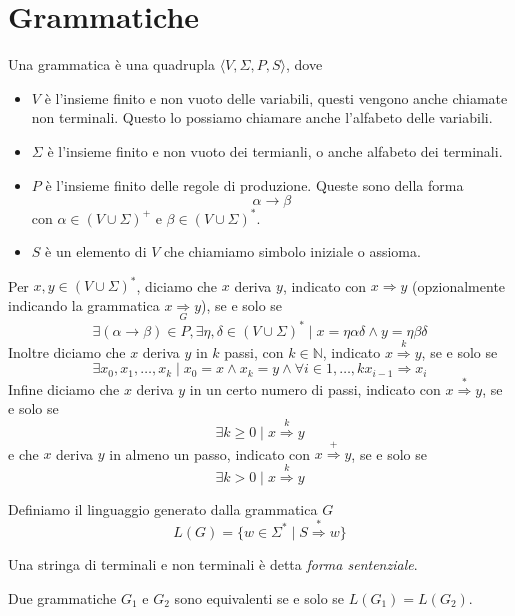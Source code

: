\documentclass[12pt]{report}
\begin{document}
\chapter{Grammatiche}
Una grammatica è una quadrupla $\langle V, \Sigma, P, S \rangle$, dove
\begin{itemize}
	\item $V$ è l'insieme finito e non vuoto delle variabili, questi vengono anche chiamate non terminali.
		Questo lo possiamo chiamare anche l'alfabeto delle variabili.
	\item $\Sigma$ è l'insieme finito e non vuoto dei termianli, o anche alfabeto dei terminali.
	\item $P$ è l'insieme finito delle regole di produzione.
		Queste sono della forma
		$$ \alpha \rightarrow \beta $$
		con $\alpha \in (V \cup \Sigma)^+$ e $\beta \in (V \cup \Sigma)^*$.
	\item $S$ è un elemento di $V$ che chiamiamo simbolo iniziale o assioma.
\end{itemize}
Per $x, y \in (V \cup \Sigma)^*$, diciamo che $x$ deriva $y$, indicato con $x \Rightarrow y$ (opzionalmente indicando la grammatica $x \underset{G}{\Rightarrow} y$), se e solo se 
$$ \exists (\alpha \rightarrow \beta) \in P, \exists \eta, \delta \in (V \cup \Sigma)^* \mid x = \eta \alpha \delta \wedge y = \eta \beta \delta $$
Inoltre diciamo che $x$ deriva $y$ in $k$ passi, con $k \in \mathbb{N}$, indicato $x \overset{k}{\Rightarrow} y$, se e solo se
$$ \exists x_0, x_1, \dots, x_k \mid x_0 = x \wedge x_k = y \wedge \forall i \in 1, \dots, k x_{i-1} \Rightarrow x_i $$
Infine diciamo che $x$ deriva $y$ in un certo numero di passi, indicato con $x \overset{*}{\Rightarrow} y$, se e solo se
$$ \exists k \geq 0 \mid x \overset{k}{\Rightarrow} y $$
e che $x$ deriva $y$ in almeno un passo, indicato con $x \overset{+}{\Rightarrow} y$, se e solo se
$$ \exists k > 0 \mid x \overset{k}{\Rightarrow} y $$

Definiamo il linguaggio generato dalla grammatica $G$ 
$$L(G) = \{ w \in \Sigma^* \mid S \overset{*}{\Rightarrow} w \} $$

Una stringa di terminali e non terminali è detta \textit{forma sentenziale}.

Due grammatiche $G_1$ e $G_2$ sono equivalenti se e solo se $L(G_1) = L(G_2)$.
\end{document}
